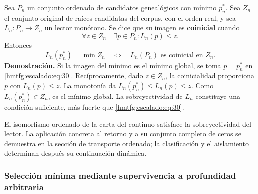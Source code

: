Sea \(P_n\) un conjunto ordenado de candidatos genealógicos con mínimo \(p_n^*\). Sea \(Z_n\) el conjunto original de raíces candidatas del corpus, con el orden real, y sea \(L_n:P_n\to Z_n\) un lector monótono. Se dice que su imagen es \textbf{coinicial} cuando
\begin{equation}
\forall z\in Z_n\quad\exists p\in P_n:
L_n(p)\le z.
\label{hmtfg:escalado:eq:30}
\end{equation}
Entonces
\begin{equation}
\boxed{L_n(p_n^*)=\min Z_n
\quad\Longleftrightarrow\quad
L_n(P_n)\text{ es coinicial en }Z_n.}
\label{hmtfg:escalado:eq:31}
\end{equation}
\textbf{Demostración.} Si la imagen del mínimo es el mínimo global, se toma \(p=p_n^*\) en \eqref{hmtfg:escalado:eq:30}. Recíprocamente, dado \(z\in Z_n\), la coinicialidad proporciona \(p\) con \(L_n(p)\le z\). La monotonía da \(L_n(p_n^*)\le L_n(p)\le z\). Como \(L_n(p_n^*)\in Z_n\), es el mínimo global. La sobreyectividad de \(L_n\) constituye una condición suficiente, más fuerte que \eqref{hmtfg:escalado:eq:30}.

El isomorfismo ordenado de la carta del continuo satisface la sobreyectividad del lector. La aplicación concreta al retorno y a su conjunto completo de ceros se demuestra en la sección de transporte ordenado; la clasificación y el aislamiento determinan después su continuación dinámica.

\subsubsection{Selección mínima mediante supervivencia a profundidad arbitraria}
\label{hmtfg:escalado:13.6}

